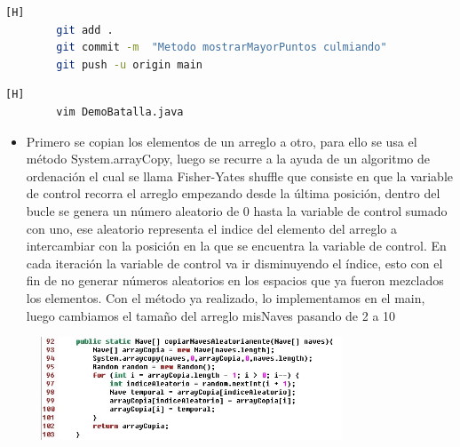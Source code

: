 \documentclass{article}
\begin{document}
	
	\begin{lstlisting}[language=bash,caption={Commit: "Metodo mostrarMayorPuntos culmiando" }][H]
		git add .
		git commit -m  "Metodo mostrarMayorPuntos culmiando"			
		git push -u origin main
	\end{lstlisting}
	
	
	
		\begin{lstlisting}[language=bash,caption={Implementando el método copiarNavesAleatoriamente y cambiando la cantidad de elementos del arreglo, pasando de 2 a 10  }][H]
		vim DemoBatalla.java
	\end{lstlisting}
	
	\begin{itemize}	
		\item Primero se copian los elementos de un arreglo a otro, para ello se usa el método System.arrayCopy, luego se recurre a la ayuda de un algoritmo de ordenación el cual se llama Fisher-Yates shuffle que consiste en que la variable de control recorra el arreglo empezando desde la última posición, dentro del bucle se genera un número aleatorio de 0 hasta la variable de control sumado con uno, ese aleatorio representa el indice del elemento del arreglo a intercambiar con la posición en la que se encuentra la variable de control. En cada iteración la variable de control va ir disminuyendo el índice, esto con el fin de no generar números aleatorios en los espacios que ya fueron mezclados los elementos. Con el método ya realizado, lo implementamos en el main, luego cambiamos el tamaño del arreglo misNaves pasando de 2 a 10
	\end{itemize}
	
	\begin{figure}[H]
		\centering
		\includegraphics[width=0.8\textwidth,keepaspectratio]{img/8.jpg}
	\end{figure}
	
\end{document}
